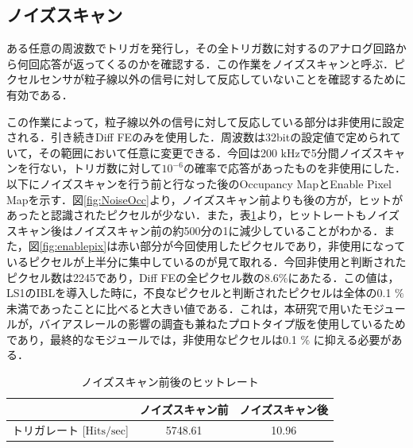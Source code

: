 \subsection{ノイズスキャン}
ある任意の周波数でトリガを発行し，その全トリガ数に対するのアナログ回路から何回応答が返ってくるのかを確認する．この作業をノイズスキャンと呼ぶ．ピクセルセンサが粒子線以外の信号に対して反応していないことを確認するために有効である．\par
この作業によって，粒子線以外の信号に対して反応している部分は非使用に設定される．引き続きDiff FEのみを使用した．周波数は32bitの設定値で定められていて，その範囲において任意に変更できる．今回は200 $\mathrm{kHz}$で5分間ノイズスキャンを行ない，トリガ数に対して$10^{-6}$の確率で応答があったものを非使用にした．以下にノイズスキャンを行う前と行なった後のOccupancy MapとEnable Pixel Mapを示す．図\ref{fig:NoiseOcc}より，ノイズスキャン前よりも後の方が，ヒットがあったと認識されたピクセルが少ない．また，表\ref{tab:noisehitrate}より，ヒットレートもノイズスキャン後はノイズスキャン前の約500分の1に減少していることがわかる．また，図\ref{fig:enablepix}は赤い部分が今回使用したピクセルであり，非使用になっているピクセルが上半分に集中しているのが見て取れる．今回非使用と判断されたピクセル数は2245であり，Diff FEの全ピクセル数の8.6\%にあたる．この値は，LS1のIBLを導入した時に，不良なピクセルと判断されたピクセルは全体の0.1 $\mathrm{\%}$未満であったことに比べると大きい値である．これは，本研究で用いたモジュールが，バイアスレールの影響の調査も兼ねたプロトタイプ版を使用しているためであり，最終的なモジュールでは，非使用なピクセルは0.1 $\mathrm{\%}$ \cite{Abbott_2018}に抑える必要がある．

%


\begin{table}[h]
  \centering
  \caption{ノイズスキャン前後のヒットレート}
  \begin{tabular} {l|cc} \hline
     & ノイズスキャン前 & ノイズスキャン後 \\ \hline \hline
    トリガレート [$\mathrm{Hits/sec}$] & 5748.61 & 10.96 \\ \hline
  \end{tabular}
  \label{tab:noisehitrate}
\end{table}

